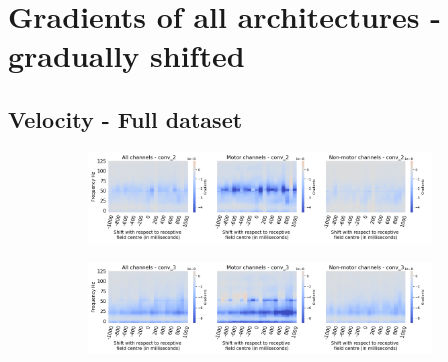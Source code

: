 \chapter{Gradients of all architectures - gradually shifted}\label{appendixC}

\section*{Velocity - Full dataset}\label{sec:velocity-appendixC}

\begin{figure}[!htpb]
\centering
\begin{subfigure}[b]{\textwidth}
   \includegraphics[width=1\linewidth]{img/appendix/C/m/vel/sbp0_m_shift_gradients_conv_2_all_kinds}
   \caption{}
   \label{fig:vel-shifting-grads-conv-2}
\end{subfigure}

\begin{subfigure}[b]{\textwidth}
   \includegraphics[width=1\linewidth]{img/appendix/C/m/vel/sbp0_m_shift_gradients_conv_3_all_kinds}
   \caption{}
   \label{fig:vel-shifting-grads-conv-3}
\end{subfigure}
\end{figure}
\clearpage
